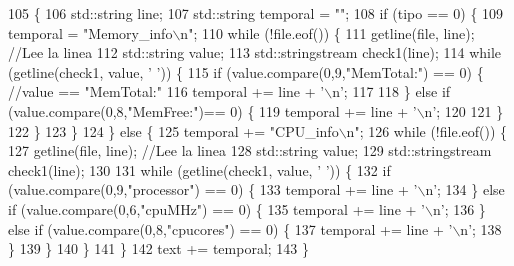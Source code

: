 \begin{DoxyCode}
105                                                                          \{
106     std::string line;
107     std::string temporal = \textcolor{stringliteral}{""};
108     \textcolor{keywordflow}{if} (tipo == 0) \{
109         temporal = \textcolor{stringliteral}{"Memory\_info\(\backslash\)n"};
110         \textcolor{keywordflow}{while} (!file.eof()) \{
111             getline(file, line); \textcolor{comment}{//Lee la linea}
112             std::string value;
113             std::stringstream check1(line);
114             \textcolor{keywordflow}{while} (getline(check1, value, \textcolor{charliteral}{' '})) \{
115                 \textcolor{keywordflow}{if} (value.compare(0,9,\textcolor{stringliteral}{"MemTotal:"}) == 0) \{ \textcolor{comment}{//value == "MemTotal:"}
116                     temporal += line + \textcolor{charliteral}{'\(\backslash\)n'};
117                     
118                 \} \textcolor{keywordflow}{else} \textcolor{keywordflow}{if} (value.compare(0,8,\textcolor{stringliteral}{"MemFree:"})== 0) \{
119                     temporal += line + \textcolor{charliteral}{'\(\backslash\)n'};
120                     
121                 \}
122             \}
123         \}
124     \} \textcolor{keywordflow}{else} \{
125         temporal += \textcolor{stringliteral}{"CPU\_info\(\backslash\)n"};
126         \textcolor{keywordflow}{while} (!file.eof()) \{
127             getline(file, line); \textcolor{comment}{//Lee la linea}
128             std::string value;
129             std::stringstream check1(line);
130             
131             \textcolor{keywordflow}{while} (getline(check1, value, \textcolor{charliteral}{' '})) \{
132                 \textcolor{keywordflow}{if} (value.compare(0,9,\textcolor{stringliteral}{"processor"}) == 0) \{
133                     temporal += line + \textcolor{charliteral}{'\(\backslash\)n'}; 
134                 \} \textcolor{keywordflow}{else} \textcolor{keywordflow}{if} (value.compare(0,6,\textcolor{stringliteral}{"cpuMHz"}) == 0) \{
135                     temporal += line + \textcolor{charliteral}{'\(\backslash\)n'};
136                 \} \textcolor{keywordflow}{else} \textcolor{keywordflow}{if} (value.compare(0,8,\textcolor{stringliteral}{"cpucores"}) == 0) \{
137                     temporal += line + \textcolor{charliteral}{'\(\backslash\)n'};
138                 \}
139             \}
140         \}
141     \}
142     text += temporal;
143 \}
\end{DoxyCode}
